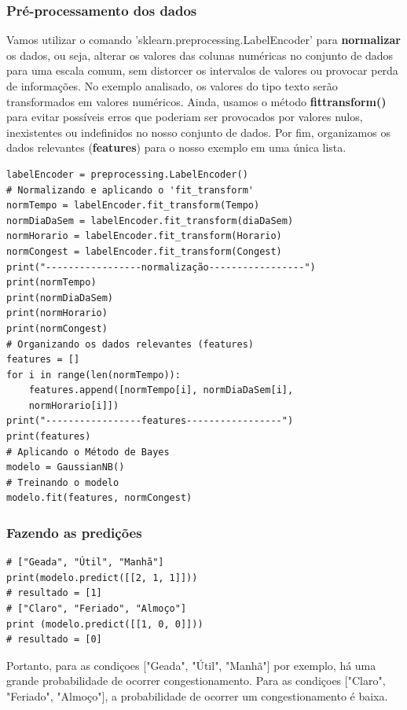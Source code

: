 \subsubsection{Pré-processamento dos dados}

Vamos utilizar o comando 'sklearn.preprocessing.LabelEncoder' para \textbf{normalizar} os dados, ou seja, alterar os valores das colunas numéricas no conjunto de dados para uma escala comum, sem distorcer os intervalos de valores ou provocar perda de informações. No exemplo analisado, os valores do tipo texto serão transformados em valores numéricos. Ainda, usamos o método \textbf{fit\textunderscore transform()} para evitar possíveis erros que poderiam ser provocados por valores nulos, inexistentes ou indefinidos no nosso conjunto de dados. Por fim, organizamos os dados relevantes (\textbf{features}) para o nosso exemplo em uma única lista.

\begin{verbatim}
labelEncoder = preprocessing.LabelEncoder()
# Normalizando e aplicando o 'fit_transform'
normTempo = labelEncoder.fit_transform(Tempo)
normDiaDaSem = labelEncoder.fit_transform(diaDaSem)
normHorario = labelEncoder.fit_transform(Horario)
normCongest = labelEncoder.fit_transform(Congest)
print("-----------------normalização-----------------")
print(normTempo)
print(normDiaDaSem)
print(normHorario)
print(normCongest)
# Organizando os dados relevantes (features)
features = []
for i in range(len(normTempo)):
	features.append([normTempo[i], normDiaDaSem[i], 
	normHorario[i]])
print("-----------------features-----------------")
print(features)
# Aplicando o Método de Bayes
modelo = GaussianNB()
# Treinando o modelo
modelo.fit(features, normCongest)
\end{verbatim}

\subsubsection{Fazendo as predições}

\begin{verbatim}
# ["Geada", "Útil", "Manhã"]
print(modelo.predict([[2, 1, 1]]))
# resultado = [1]
# ["Claro", "Feriado", "Almoço"]
print (modelo.predict([[1, 0, 0]]))
# resultado = [0]
\end{verbatim}

Portanto, para as condiçoes ["Geada", "Útil", "Manhã"] por exemplo, há uma grande probabilidade de ocorrer congestionamento.
Para as condiçoes ["Claro", "Feriado", "Almoço"], a probabilidade de ocorrer um congestionamento é baixa.

